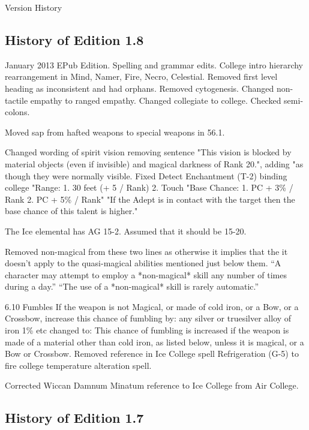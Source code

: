 \begin{Chapter}{Version History}
\begin{Description}
\end{Description}

\subsection{History of Edition 1.8}

\begin{Description}

\item[January 2013] EPub Edition. Spelling and grammar edits.  College
  intro hierarchy rearrangement in Mind, Namer, Fire, Necro,
  Celestial. Removed first level heading as inconsistent and had
  orphans.  Removed cytogenesis.  Changed non-tactile empathy to
  ranged empathy.  Changed collegiate to college. Checked semi-colons.

Moved sap from hafted weapons to special weapons in 56.1.

Changed wording of spirit vision removing sentence "This vision is
blocked by material objects (even if invisible) and magical darkness
of Rank 20.", adding "as though they were normally visible.  Fixed
Detect Enchantment (T-2) binding college "Range: 1.  30 feet (+ 5 /
Rank) 2.  Touch "Base Chance: 1. PC + 3\% / Rank 2. PC + 5\% / Rank"
"If the Adept is in contact with the target then the base chance of
this talent is higher."

The Ice elemental has AG 15-2.  Assumed that it should be 15-20.

Removed non-magical from these two lines as otherwise it implies that
the it doesn't apply to the quasi-magical abilities mentioned just
below them.  “A character may attempt to employ a *non-magical* skill
any number of times during a day.”  “The use of a *non-magical* skill
is rarely automatic.”

6.10 Fumbles If the weapon is not Magical, or made of cold iron, or a
Bow, or a Crossbow, increase this chance of fumbling by: any silver or
truesilver alloy of iron 1\% etc changed to: This chance of fumbling
is increased if the weapon is made of a material other than cold iron,
as listed below, unless it is magical, or a Bow or Crossbow.  Removed
reference in Ice College spell Refrigeration (G-5) to fire college
temperature alteration spell.

Corrected Wiccan Damnum Minatum reference to Ice College from Air
College.
\end{Description}

\subsection{History of Edition 1.7}


\end{Chapter}
